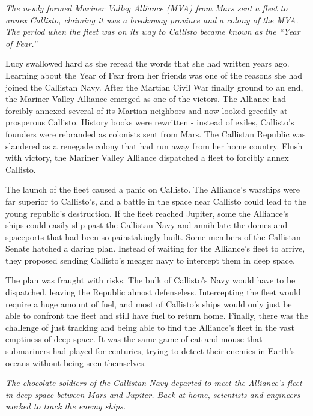 \documentclass[12pt]{article} %
\begin{document}
\textit{The newly formed Mariner Valley Alliance (MVA) from Mars sent a fleet to annex Callisto, claiming it was a breakaway province and a colony of the MVA. The period when the fleet was on its way to Callisto became known as the ``Year of Fear.''}

Lucy swallowed hard as she reread the words that she had written years ago. Learning about the Year of Fear from her friends was one of the reasons she had joined the Callistan Navy. After the Martian Civil War finally ground to an end, the Mariner Valley Alliance emerged as one of the victors. The Alliance had forcibly annexed several of its Martian neighbors and now looked greedily at prosperous Callisto. History books were rewritten - instead of exiles, Callisto's founders were rebranded as colonists sent from Mars. The Callistan Republic was slandered as a renegade colony that had run away from her home country. Flush with victory, the Mariner Valley Alliance dispatched a fleet to forcibly annex Callisto.

The launch of the fleet caused a panic on Callisto. The Alliance's warships were far superior to Callisto's, and a battle in the space near Callisto could lead to the young republic's destruction. If the fleet reached Jupiter, some the Alliance's ships could easily slip past the Callistan Navy and annihilate the domes and spaceports that had been so painstakingly built. Some members of the Callistan Senate hatched a daring plan. Instead of waiting for the Alliance's fleet to arrive, they proposed sending Callisto's meager navy to intercept them in deep space.

The plan was fraught with risks. The bulk of Callisto's Navy would have to be dispatched, leaving the Republic almost defenseless. Intercepting the fleet would require a huge amount of fuel, and most of Callisto's ships would only just be able to confront the fleet and still have fuel to return home. Finally, there was the challenge of just tracking and being able to find the Alliance's fleet in the vast emptiness of deep space. It was the same game of cat and mouse that submariners had played for centuries, trying to detect their enemies in Earth's oceans without being seen themselves.

\textit{The chocolate soldiers of the Callistan Navy departed to meet the Alliance's fleet in deep space between Mars and Jupiter. Back at home, scientists and engineers worked to track the enemy ships.}
\end{document}
